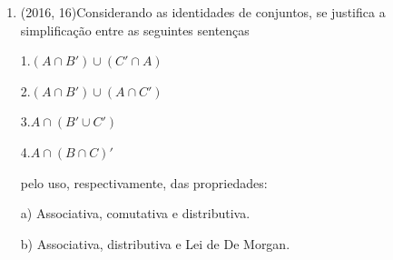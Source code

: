 \documentclass{article}
\begin{document}
\begin{enumerate}
e) Todas as métricas de avaliação foram negativas ou zero.\newline


 \textbf{RESOLUÇÃO}

$\rule[1cm]{100cm}{1px}$

p: as métricas de avaliação foram positivas \newline

1. $\forall (p)$

2. $\sim(\forall (p))$

3. $\exists (\sim p)$ \newline


d) Alguma métrica de avaliação foi negativa ou zero. \newline

\textbf{CONTEÚDO}

$\rule[1cm]{100cm}{1px}$

A expressão "para todo" ($\forall$) é utilizada quando a propriedade enunciada é verdadeira para "qualquer que seja" o elemento no universo considerado.

A expressão "existe" ($\exists$)  é utilizada quando a propriedade enunciada admite pelo menos um elemento no universo considerado que a verifica.

 se p é a proposição:$\forall (p)$ , isto é, "qualquer que seja x, x verifica a propriedade p", a negação do "para todo" significa que "existe" algum elemento no universo que não satisfaz a propriedade em questão. Ou seja, existe pelo menos um elemento no universo que não verifica a propriedade P.

\newpage




\item (2016, 16)Considerando as identidades de conjuntos, se justifica a simplificação entre as
seguintes sentenças\newline

1.$(A \cap B' ) \cup (C' \cap A)$

2.$(A \cap B' ) \cup (A \cap C')$

3.$A \cap (B' \cup C')$

4.$A \cap (B \cap C )'$\newline


pelo uso, respectivamente, das propriedades:\newline

a) Associativa, comutativa e distributiva.

b) Associativa, distributiva e Lei de De Morgan.


\end{enumerate}
\end{document}
